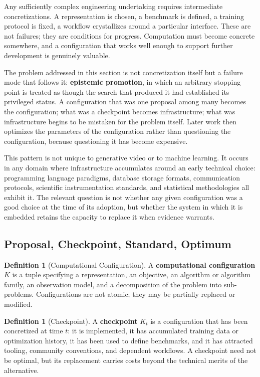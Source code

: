 \documentclass[11pt,a4paper]{article}
\theoremstyle{plain}
\theoremstyle{definition}
\newtheorem{definition}[theorem]{Definition}
\theoremstyle{remark}
\begin{document}
Any sufficiently complex engineering undertaking requires intermediate concretizations. A representation is chosen, a benchmark is defined, a training protocol is fixed, a workflow crystallizes around a particular interface. These are not failures; they are conditions for progress. Computation must become concrete somewhere, and a configuration that works well enough to support further development is genuinely valuable.

The problem addressed in this section is not concretization itself but a failure mode that follows it: \textbf{epistemic promotion}, in which an arbitrary stopping point is treated as though the search that produced it had established its privileged status. A configuration that was one proposal among many becomes the configuration; what was a checkpoint becomes infrastructure; what was infrastructure begins to be mistaken for the problem itself. Later work then optimizes the parameters of the configuration rather than questioning the configuration, because questioning it has become expensive.

This pattern is not unique to generative video or to machine learning. It occurs in any domain where infrastructure accumulates around an early technical choice: programming language paradigms, database storage formats, communication protocols, scientific instrumentation standards, and statistical methodologies all exhibit it. The relevant question is not whether any given configuration was a good choice at the time of its adoption, but whether the system in which it is embedded retains the capacity to replace it when evidence warrants.

\subsection{Proposal, Checkpoint, Standard, Optimum}

\begin{definition}[Computational Configuration]
A \textbf{computational configuration} $K$ is a tuple specifying a representation, an objective, an algorithm or algorithm family, an observation model, and a decomposition of the problem into sub-problems. Configurations are not atomic; they may be partially replaced or modified.
\end{definition}

\begin{definition}[Checkpoint]
A \textbf{checkpoint} $K_t$ is a configuration that has been concretized at time $t$: it is implemented, it has accumulated training data or optimization history, it has been used to define benchmarks, and it has attracted tooling, community conventions, and dependent workflows. A checkpoint need not be optimal, but its replacement carries costs beyond the technical merits of the alternative.
\end{definition}
\end{document}
